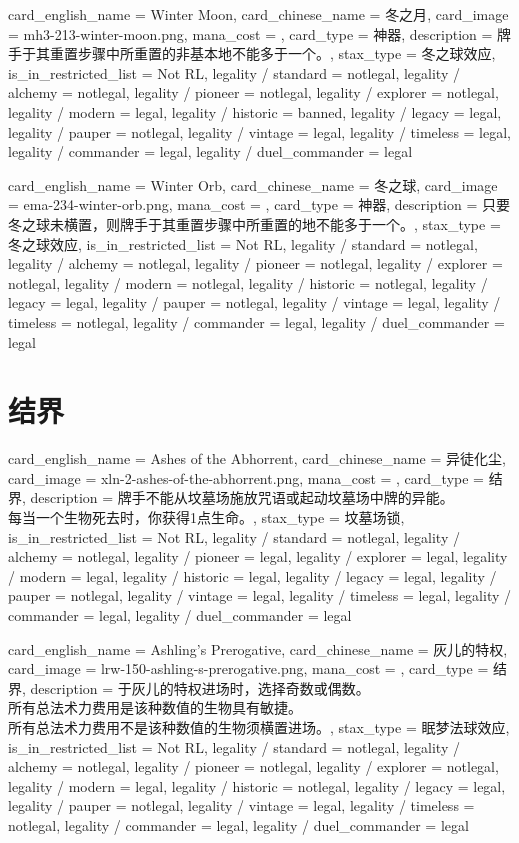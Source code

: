 \documentclass[lang = cn, color = black, 10pt]{AllThatStax}
\begin{document}
\card
{
	card_english_name = {Winter Moon},
	card_chinese_name = {冬之月},
	card_image = mh3-213-winter-moon.png,
	mana_cost = ,
	card_type = 神器,
	description = {牌手于其重置步骤中所重置的非基本地不能多于一个。},
	stax_type = 冬之球效应,
	is_in_restricted_list = Not RL,
	legality / standard = notlegal,
	legality / alchemy = notlegal,
	legality / pioneer = notlegal,
	legality / explorer = notlegal,
	legality / modern = legal,
	legality / historic = banned,
	legality / legacy = legal,
	legality / pauper = notlegal,
	legality / vintage = legal,
	legality / timeless = legal,
	legality / commander = legal,
	legality / duel_commander = legal
}

\card
{
	card_english_name = {Winter Orb},
	card_chinese_name = {冬之球},
	card_image = ema-234-winter-orb.png,
	mana_cost = ,
	card_type = 神器,
	description = {只要冬之球未横置，则牌手于其重置步骤中所重置的地不能多于一个。},
	stax_type = 冬之球效应,
	is_in_restricted_list = Not RL,
	legality / standard = notlegal,
	legality / alchemy = notlegal,
	legality / pioneer = notlegal,
	legality / explorer = notlegal,
	legality / modern = notlegal,
	legality / historic = notlegal,
	legality / legacy = legal,
	legality / pauper = notlegal,
	legality / vintage = legal,
	legality / timeless = notlegal,
	legality / commander = legal,
	legality / duel_commander = legal
}

\section{结界}

\card
{
	card_english_name = {Ashes of the Abhorrent},
	card_chinese_name = {异徒化尘},
	card_image = xln-2-ashes-of-the-abhorrent.png,
	mana_cost = ,
	card_type = 结界,
	description = {牌手不能从坟墓场施放咒语或起动坟墓场中牌的异能。\\
每当一个生物死去时，你获得1点生命。},
	stax_type = 坟墓场锁,
	is_in_restricted_list = Not RL,
	legality / standard = notlegal,
	legality / alchemy = notlegal,
	legality / pioneer = legal,
	legality / explorer = legal,
	legality / modern = legal,
	legality / historic = legal,
	legality / legacy = legal,
	legality / pauper = notlegal,
	legality / vintage = legal,
	legality / timeless = legal,
	legality / commander = legal,
	legality / duel_commander = legal
}

\card
{
	card_english_name = {Ashling's Prerogative},
	card_chinese_name = {灰儿的特权},
	card_image = lrw-150-ashling-s-prerogative.png,
	mana_cost = ,
	card_type = 结界,
	description = {于灰儿的特权进场时，选择奇数或偶数。 \\
所有总法术力费用是该种数值的生物具有敏捷。\\
所有总法术力费用不是该种数值的生物须横置进场。},
	stax_type = 眠梦法球效应,
	is_in_restricted_list = Not RL,
	legality / standard = notlegal,
	legality / alchemy = notlegal,
	legality / pioneer = notlegal,
	legality / explorer = notlegal,
	legality / modern = legal,
	legality / historic = notlegal,
	legality / legacy = legal,
	legality / pauper = notlegal,
	legality / vintage = legal,
	legality / timeless = notlegal,
	legality / commander = legal,
	legality / duel_commander = legal
}
\end{document}
